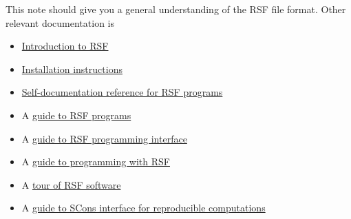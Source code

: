 This note should give you a general understanding of the RSF file
format. Other relevant documentation is 
\begin{itemize}
\item \href{http://www.reproducibility.org/RSF/book/rsf/rsf/paper_html/}{Introduction to RSF}
\item \href{http://www.reproducibility.org/RSF/book/rsf/rsf/install_html/}{Installation instructions}
\item \href{http://www.reproducibility.org/RSF/}{Self-documentation reference for RSF programs}
\item A \href{http://www.reproducibility.org/RSF/book/rsf/rsf/prog_html/}{guide to RSF programs}
\item A \href{http://www.reproducibility.org/RSF/book/rsf/rsf/api_html/}{guide to RSF programming interface}
\item A \href{http://www.reproducibility.org/RSF/book/rsf/rsf/demo_html/}{guide to programming with RSF}
\item A \href{http://www.reproducibility.org/RSF/book/rsf/rsf/tour_html/}{tour of RSF software}
\item A \href{http://www.reproducibility.org/RSF/book/rsf/scons/paper_html/}{guide to SCons interface for reproducible computations}
\end{itemize}




